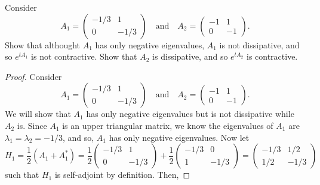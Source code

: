 \documentclass{exam}
\begin{document}
\begin{questions}
        \question Consider 
        \[
            A_1 = \begin{pmatrix}
                -1/3 & 1 \\
                0 & -1/3
            \end{pmatrix} 
            \quad\text{and}\quad A_2 = \begin{pmatrix}
                -1 & 1 \\
                0 & -1
            \end{pmatrix}.
        \]
        Show that althought $A_1$ has only negative eigenvalues, $A_1$ is not dissipative, and so $e^{tA_{1}}$ is not contractive. Show that $A_2$ is dissipative, and so $e^{tA_{2}}$ is contractive. 
        \begin{solution}
            \begin{proof}
            Consider 
            \[
                A_1 = \begin{pmatrix}
                    -1/3 & 1 \\
                    0 & -1/3
                \end{pmatrix} 
                \quad\text{and}\quad A_2 = \begin{pmatrix}
                    -1 & 1 \\
                    0 & -1
                \end{pmatrix}.
            \]
            We will show that $A_1$ has only negative eigenvalues but is not dissipative while $A_2$ is. Since $A_1$ is an upper triangular matrix, we know the eigenvalues of $A_1$ are $\lambda_1 = \lambda_2 = -1/3$, and so, $A_1$ has only negative eigenvalues. Now let 
            \[
                H_1 = \frac{1}{2}\left(A_1 + A_1^*\right) = \frac{1}{2}\begin{pmatrix}
                    -1/3 & 1 \\
                    0 & -1/3
                \end{pmatrix}
                + \frac{1}{2}\begin{pmatrix}
                    -1/3 & 0 \\
                    1 & -1/3
                \end{pmatrix}
                = \begin{pmatrix}
                    -1/3 & 1/2 \\
                    1/2 & -1/3    
                \end{pmatrix}
            \]
            such that $H_1$ is self-adjoint by definition. Then, 

\end{proof}
\end{solution}
\end{questions}
\end{document}

